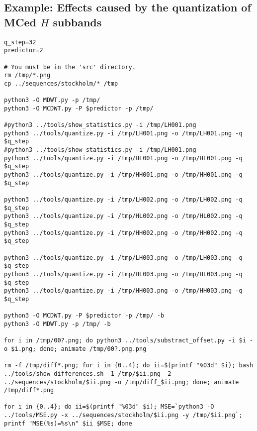 \subsection*{Example: Effects caused by the quantization of MCed $H$ subbands}
\begin{verbatim}
q_step=32
predictor=2

# You must be in the 'src' directory.
rm /tmp/*.png
cp ../sequences/stockholm/* /tmp

python3 -O MDWT.py -p /tmp/
python3 -O MCDWT.py -P $predictor -p /tmp/

#python3 ../tools/show_statistics.py -i /tmp/LH001.png
python3 ../tools/quantize.py -i /tmp/LH001.png -o /tmp/LH001.png -q $q_step
#python3 ../tools/show_statistics.py -i /tmp/LH001.png
python3 ../tools/quantize.py -i /tmp/HL001.png -o /tmp/HL001.png -q $q_step
python3 ../tools/quantize.py -i /tmp/HH001.png -o /tmp/HH001.png -q $q_step

python3 ../tools/quantize.py -i /tmp/LH002.png -o /tmp/LH002.png -q $q_step
python3 ../tools/quantize.py -i /tmp/HL002.png -o /tmp/HL002.png -q $q_step
python3 ../tools/quantize.py -i /tmp/HH002.png -o /tmp/HH002.png -q $q_step

python3 ../tools/quantize.py -i /tmp/LH003.png -o /tmp/LH003.png -q $q_step
python3 ../tools/quantize.py -i /tmp/HL003.png -o /tmp/HL003.png -q $q_step
python3 ../tools/quantize.py -i /tmp/HH003.png -o /tmp/HH003.png -q $q_step

python3 -O MCDWT.py -P $predictor -p /tmp/ -b
python3 -O MDWT.py -p /tmp/ -b

for i in /tmp/00?.png; do python3 ../tools/substract_offset.py -i $i -o $i.png; done; animate /tmp/00?.png.png

rm -f /tmp/diff*.png; for i in {0..4}; do ii=$(printf "%03d" $i); bash ../tools/show_differences.sh -1 /tmp/$ii.png -2 ../sequences/stockholm/$ii.png -o /tmp/diff_$ii.png; done; animate /tmp/diff*.png

for i in {0..4}; do ii=$(printf "%03d" $i); MSE=`python3 -O ../tools/MSE.py -x ../sequences/stockholm/$ii.png -y /tmp/$ii.png`; printf "MSE(%s)=%s\n" $ii $MSE; done
\end{verbatim}


